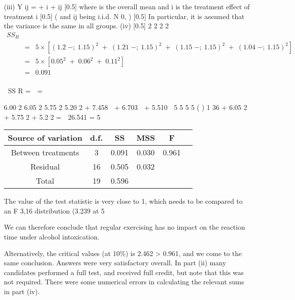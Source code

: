 \documentclass[a4paper,12pt]{article}
\begin{document}
(iii) Y ij \;=\; \mu + \tau i + \varepsilon ij
[0.5]
where \mu is the overall mean and \tau i is the treatment effect of treatment i [0.5]
(
and \varepsilon ij being i.i.d. N 0, 
)
[0.5]
In particular, it is assumed that the variance is the same in all groups.
(iv)
[0.5]
2
2
2
2
\begin{eqnarray*}
SS_{B} \\ 
&=& 5 \times \left[  \left(  1.2 \;-;\ 1.15 \right)^2 \;+\; \left(  1.21 \;-;\ 1.15 \right)^2 \;+\; \left(  1.15 \;-;\ 1.15 \right)^2 \;+\; \left(  1.04 \;-;\ 1.15 \right)^2 \right] \\
&=& 5 \times \left[ 0.05^2 \;+\; 0.06^2 \;+\; 0.11^2 \right] \\
&=& 0.091\\
\end{eqnarray*}


SS R \;= 
\;= 

6.00 2
6.05 2
5.75 2
5.20 2
+ 7.458 
+ 6.703 
+ 5.510 
5
5
5
5
(
)
1
36 + 6.05 2 + 5.75 2 + 5.2 2 \;=  26.541 \;=
5



\begin{center}
\begin{tabular}{|c|c|c|c|c|c|}
Source of variation	&	d.f. 	&	SS 	&	MSS	& F \\  \hline 
Between treatments	&	3 & 0.091 	& 0.030 & 	0.961 & \\ \hline 
Residual	&	16 & 	0.505 & 	0.032 & & \\ \hline

Total 	&	19	&	0.596	&		& \\ \hline 
\end{tabular}
\end{center}

The value of the test statistic is very close to 1, which needs to be compared to
an F 3,16 distribution (3.239 at 5%

We can therefore conclude that regular exercising has no impact on the reaction time under alcohol intoxication.

Alternatively, the critical values (at 10\%) is 2.462 > 0.961, and we come to the same conclusion.
Answers were very satisfactory overall. In part (ii) many candidates performed a full test, and received full credit, but note that this was not required. There were some numerical errors in calculating the
relevant sums in part (iv).
\end{document}
